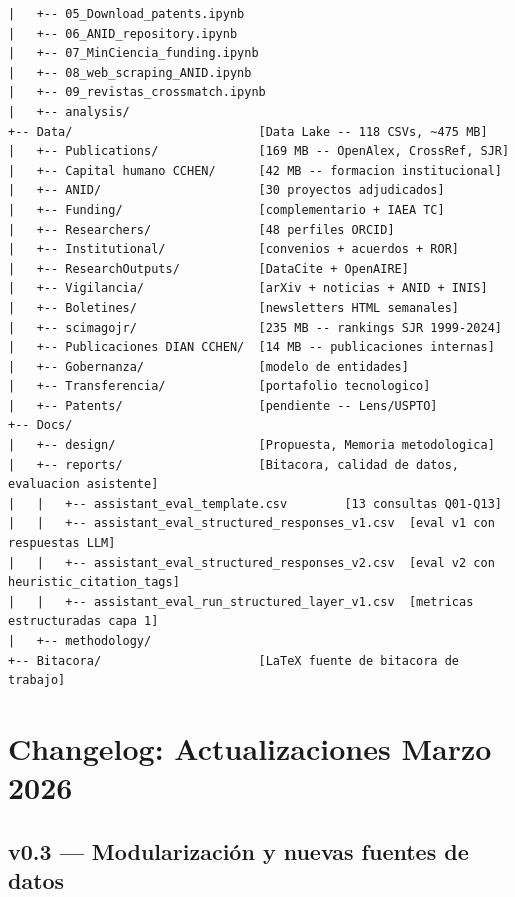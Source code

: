 \documentclass[12pt,a4paper]{report}
\begin{document}
\begin{lstlisting}[caption={Arbol de directorios del proyecto}, style=bashstyle]
|   +-- 05_Download_patents.ipynb
|   +-- 06_ANID_repository.ipynb
|   +-- 07_MinCiencia_funding.ipynb
|   +-- 08_web_scraping_ANID.ipynb
|   +-- 09_revistas_crossmatch.ipynb
|   +-- analysis/
+-- Data/                          [Data Lake -- 118 CSVs, ~475 MB]
|   +-- Publications/              [169 MB -- OpenAlex, CrossRef, SJR]
|   +-- Capital humano CCHEN/      [42 MB -- formacion institucional]
|   +-- ANID/                      [30 proyectos adjudicados]
|   +-- Funding/                   [complementario + IAEA TC]
|   +-- Researchers/               [48 perfiles ORCID]
|   +-- Institutional/             [convenios + acuerdos + ROR]
|   +-- ResearchOutputs/           [DataCite + OpenAIRE]
|   +-- Vigilancia/                [arXiv + noticias + ANID + INIS]
|   +-- Boletines/                 [newsletters HTML semanales]
|   +-- scimagojr/                 [235 MB -- rankings SJR 1999-2024]
|   +-- Publicaciones DIAN CCHEN/  [14 MB -- publicaciones internas]
|   +-- Gobernanza/                [modelo de entidades]
|   +-- Transferencia/             [portafolio tecnologico]
|   +-- Patents/                   [pendiente -- Lens/USPTO]
+-- Docs/
|   +-- design/                    [Propuesta, Memoria metodologica]
|   +-- reports/                   [Bitacora, calidad de datos, evaluacion asistente]
|   |   +-- assistant_eval_template.csv        [13 consultas Q01-Q13]
|   |   +-- assistant_eval_structured_responses_v1.csv  [eval v1 con respuestas LLM]
|   |   +-- assistant_eval_structured_responses_v2.csv  [eval v2 con heuristic_citation_tags]
|   |   +-- assistant_eval_run_structured_layer_v1.csv  [metricas estructuradas capa 1]
|   +-- methodology/
+-- Bitacora/                      [LaTeX fuente de bitacora de trabajo]
\end{lstlisting}

\chapter*{Changelog: Actualizaciones Marzo 2026}

\section*{v0.3 --- Modularización y nuevas fuentes de datos}
\end{document}
